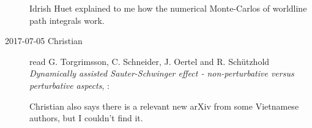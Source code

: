 \begin{description}
Idrish Huet explained to me how the numerical Monte-Carlos of
worldline path integrals work.

\item[2017-07-05 Christian] read
    G. Torgrimsson, C. Schneider, J. Oertel and R. Schützhold
{\em Dynamically assisted {Sauter-Schwinger} effect - non-perturbative
versus perturbative aspects},
:

Christian also says there is a relevant new arXiv from some Vietnamese
authors, but I couldn't find it.

\end{description}
